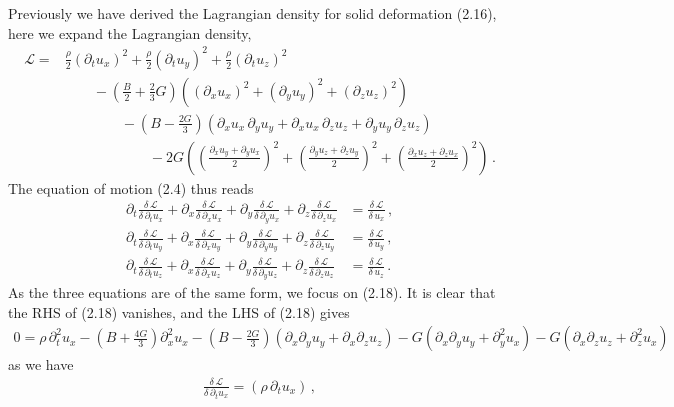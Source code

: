 \documentclass[11pt, onesided]{book}
\theoremstyle{break}
\theoremstyle{break}
\newcommand{\pd}{\partial}
\begin{document}
Previously we have derived the Lagrangian density for solid deformation (2.16), here we expand the Lagrangian density,
\begin{align*}
\mathcal{L}=& \frac{\rho}{2}\left( \pd_t u_x\right)^2 + \frac{\rho}{2}\left(\pd_t u_y\right)^2 + \frac{\rho}{2}\left(\pd_t u_z\right)^2 \\
&{}\qquad - \left( \frac{B}{2}+ \frac{2}{3}G\right) \left( (\pd_x u_x)^2+(\pd_y u_y)^2 + (\pd_z u_z)^2 \right) \\
&{}\qquad\qquad-\left( B-\frac{2G}{3}\right) \left( \pd_x u_x \, \pd_yu_y + \pd_xu_x\, \pd_zu_z + \pd_yu_y\,\pd_zu_z\right) \\
&{}\qquad\qquad\qquad -2G\left( \left( \frac{\pd_xu_y + \pd_y u_x}{2}\right)^2+
\left( \frac{\pd_yu_z + \pd_z u_y}{2}\right)^2+
\left( \frac{\pd_xu_z + \pd_z u_x}{2}\right)^2\right)\,.
\end{align*}
The equation of motion (2.4) thus reads
\begin{align}
\pd_t \frac{\delta\, \mathcal{L}}{\delta \, \pd_t u_x}+
\pd_x \frac{\delta\, \mathcal{L}}{\delta \, \pd_x u_x}+
\pd_y \frac{\delta\, \mathcal{L}}{\delta \, \pd_y u_x}+
\pd_z \frac{\delta\, \mathcal{L}}{\delta \, \pd_z u_x} &= \frac{\delta\, \mathcal{L}}{\delta\, u_x}\,,\\
\pd_t \frac{\delta\, \mathcal{L}}{\delta \, \pd_t u_y}+
\pd_x \frac{\delta\, \mathcal{L}}{\delta \, \pd_x u_y}+
\pd_y \frac{\delta\, \mathcal{L}}{\delta \, \pd_y u_y}+
\pd_z \frac{\delta\, \mathcal{L}}{\delta \, \pd_z u_y} &= \frac{\delta\, \mathcal{L}}{\delta\, u_y}\,,\\
\pd_t \frac{\delta\, \mathcal{L}}{\delta \, \pd_t u_z}+
\pd_x \frac{\delta\, \mathcal{L}}{\delta \, \pd_x u_z}+
\pd_y \frac{\delta\, \mathcal{L}}{\delta \, \pd_y u_z}+
\pd_z \frac{\delta\, \mathcal{L}}{\delta \, \pd_z u_z} &= \frac{\delta\, \mathcal{L}}{\delta\, u_z}\,.
\end{align}
As the three equations are of the same form, we focus on (2.18). It is clear that the RHS of (2.18) vanishes, and the LHS of (2.18) gives
\begin{align*}
0 = \rho\,\pd_t^2u_x - \left( B + \frac{4G}{3}\right) \pd_x^2 u_x - \left( B - \frac{2G}{3}\right) \left(\pd_x\pd_y u_y + \pd_x\pd_zu_z\right) - G\left(\pd_x\pd_y u_y + \pd_y^2 u_x\right)- G\left( \pd_x\pd_z u_z + \pd_z^2u_x\right)
\end{align*}
as we have
\begin{align*}
\frac{\delta\, \mathcal{L}}{\delta \, \pd_t u_x} =(\rho\, \pd_t u_x)\,,
\end{align*}
\end{document}
